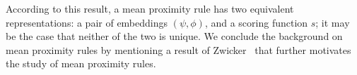 \documentclass[prodmode]{acmsmall-ec14}
\newcommand{\calL}{{\mathcal{L}}}
\newcommand{\rank}{{\calL(A)}}
\newcommand{\calO}{{\mathcal{O}}}
\begin{document}
%

\noindent
According to this result, a mean proximity rule has two equivalent representations: a pair of embeddings $(\psi,\phi)$, and a scoring function $s$; it may be the case that neither of the two is unique. We conclude the background on mean proximity rules by mentioning a result of Zwicker~ that further motivates the study of mean proximity rules.
\end{document}
